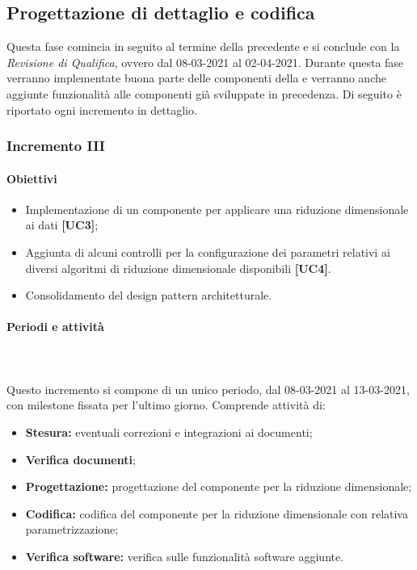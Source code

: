 \subsection{Progettazione di dettaglio e codifica}
Questa fase comincia in seguito al termine della precedente e si conclude con la \textit{Revisione di Qualifica}, ovvero dal 08-03-2021 al 02-04-2021. Durante questa fase verranno implementate buona parte delle componenti della  e verranno anche aggiunte funzionalità alle componenti già sviluppate in precedenza.
Di seguito è riportato ogni incremento in dettaglio.

\subsubsection{Incremento III} 

\paragraph{Obiettivi}
\begin{itemize}
\item Implementazione di un componente per applicare una riduzione dimensionale ai dati  \textbf{[UC3]};
\item Aggiunta di alcuni controlli per la configurazione dei parametri relativi ai diversi algoritmi di riduzione dimensionale disponibili \textbf{[UC4]}.
\item Consolidamento del design pattern architetturale.
\end{itemize}

\paragraph{Periodi e attività} \mbox{}\\\mbox{}\\
Questo incremento si compone di un unico periodo, dal 08-03-2021 al 13-03-2021, con milestone fissata per l'ultimo giorno. Comprende attività di:
\begin{itemize}
\item \textbf{Stesura:} eventuali correzioni e integrazioni ai documenti;
\item \textbf{Verifica documenti};
\item \textbf{Progettazione:} progettazione del componente per la riduzione dimensionale;
\item \textbf{Codifica:} codifica del componente per la riduzione dimensionale con relativa parametrizzazione;
\item \textbf{Verifica software:} verifica sulle funzionalità software aggiunte.
\end{itemize}

